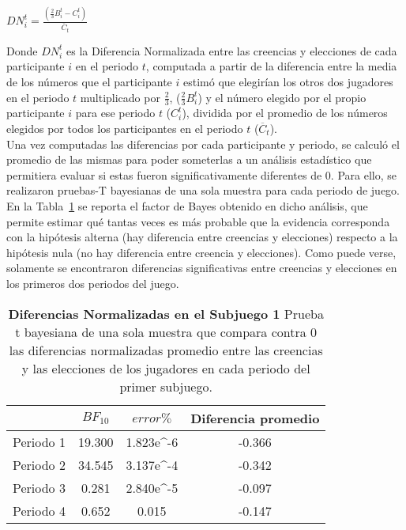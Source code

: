 \begin{center}
$DN_i^t =  \frac{(\frac{2}{3}B_i^t - C_i^t)}{\overline{C}_t} $
\end{center}

Donde $DN_i^t$ es la Diferencia Normalizada entre las creencias y elecciones de cada participante $i$ en el periodo $t$, computada a partir de la diferencia entre  la media de los números que el participante $i$ estimó que elegirían los otros dos jugadores en el periodo $t$ multiplicado por $\frac{2}{3}$, ($\frac{2}{3}B_i^t$) y el número elegido por el propio participante $i$ para ese periodo $t$ ($C_i^t$), dividida por el promedio de los números elegidos por todos los participantes en el periodo $t$ ($\overline{C}_t$).\\

Una vez computadas las diferencias por cada participante y periodo, se calculó el promedio de las mismas para poder someterlas a un análisis estadístico que permitiera evaluar si estas fueron significativamente diferentes de 0. Para ello, se realizaron pruebas-T bayesianas de una sola muestra para cada periodo de juego. En la Tabla~\ref{DN-S1-B} se reporta el factor de Bayes obtenido en dicho análisis, que permite estimar qué tantas veces es más probable que la evidencia corresponda con la hipótesis alterna (hay diferencia entre creencias y elecciones) respecto a la hipótesis nula (no hay diferencia entre creencia y elecciones). Como puede verse, solamente se encontraron diferencias significativas entre creencias y elecciones en los primeros dos periodos del juego.\\

\begin{table}[h]
\caption[Prueba t de una muestra: Diferencias Normalizadas en el Subjuego 1]{\textbf{Diferencias Normalizadas en el Subjuego 1} Prueba t bayesiana de una sola muestra que compara contra 0 las diferencias normalizadas promedio entre las creencias y las elecciones de los jugadores en cada periodo del primer subjuego.}
\label{DN-S1-B}
\centering
\begin{tabular}{l | c c | c}
\toprule
\textbf{} & \textbf{$BF_{10}$} & \textbf{$error\%$} & \textbf{Diferencia promedio}\\
\midrule
Periodo 1 & 19.300 & 1.823e^-6 & -0.366\\
Periodo 2 & 34.545 & 3.137e^-4 & -0.342\\
Periodo 3 & 0.281 & 2.840e^-5 & -0.097\\
Periodo 4 & 0.652 & 0.015 & -0.147\\
\bottomrule
\end{tabular}
\end{table}

